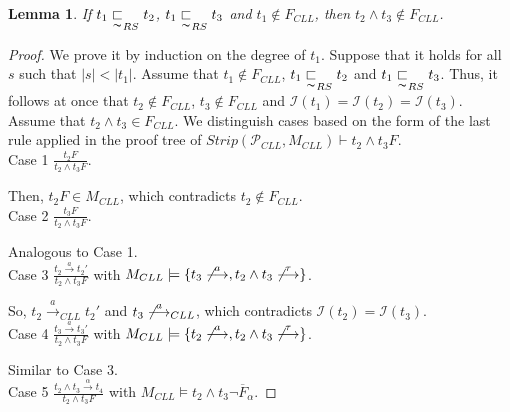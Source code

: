 \documentclass{elsarticle}
\theoremstyle{plain}
\newtheorem{lemma}[theorem]{Lemma}
\theoremstyle{definition}
\begin{document}
\begin{lemma}\label{L:RS_CON}
If $t_1 \underset{\thicksim}{\sqsubset}_{RS} t_2$, $t_1 \underset{\thicksim}{\sqsubset}_{RS} t_3$ and $t_1 \notin F_{{CLL}}$, then $t_2 \wedge t_3 \notin F_{{CLL}}$.
\end{lemma}
\begin{proof}
    We prove it by induction on the degree of $t_1$.
    Suppose that it holds for all $s$ such that $|s|<|t_1|$.
    Assume that $t_1 \notin F_{{CLL}}$, $t_1 \underset{\thicksim}{\sqsubset}_{RS} t_2$ and $t_1 \underset{\thicksim}{\sqsubset}_{RS} t_3$.
    Thus, it follows at once that $t_2 \notin F_{{CLL}}$, $t_3 \notin F_{{CLL}}$ and ${\mathcal I}(t_1)={\mathcal I}(t_2)={\mathcal I}(t_3)$.
    Assume that $t_2 \wedge t_3 \in F_{{CLL}}$.
    We distinguish cases based on the form of the last rule applied in the proof tree of $Strip({\mathcal P}_{CLL},M_{{CLL}}) \vdash t_2 \wedge t_3F$.\\

\noindent Case 1 $\frac{t_2F}{t_2 \wedge t_3  F}$.

            Then, $ t_2F \in M_{{CLL}}$, which contradicts $t_2 \notin F_{{CLL}}$.\\

\noindent Case 2 $\frac{t_3F}{t_2 \wedge t_3  F}$.

            Analogous to Case 1.\\

\noindent Case 3 $\frac{t_2 \stackrel{a}{\longrightarrow} t_2'}{t_2 \wedge t_3  F}$ with $M_{{CLL}} \models \{t_3 \not\stackrel{a}{\longrightarrow} , t_2 \wedge t_3 \not\stackrel{\tau}{\longrightarrow}\}$.

            So, $ t_2 \stackrel{a}{\longrightarrow}_{CLL} t_2'$ and $ t_3 \not\stackrel{a}{\longrightarrow}_{CLL}$, which contradicts ${\mathcal I}(t_2)={\mathcal I}(t_3)$.\\

\noindent Case 4  $\frac{t_3 \stackrel{a}{\longrightarrow} t_3'}{t_2 \wedge t_3  F}$ with $M_{{CLL}} \models \{t_2 \not\stackrel{a}{\longrightarrow} , t_2 \wedge t_3 \not\stackrel{\tau}{\longrightarrow}\}$.

          Similar to Case 3.\\

\noindent Case 5 $\frac{t_2 \wedge t_3 \stackrel{\alpha}{\longrightarrow} t_4}{t_2 \wedge t_3  F}$ with $M_{{CLL}} \models t_2 \wedge t_3 \neg \overline{F}_{\alpha}$.


\end{proof}
\end{document}
